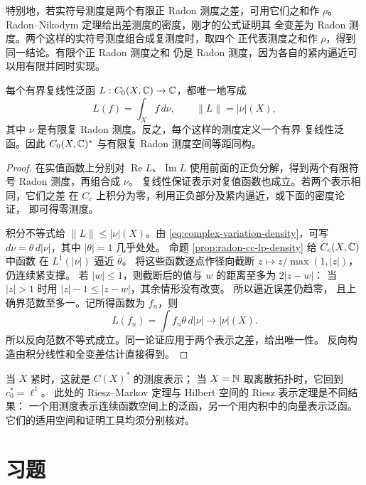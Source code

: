 特别地，若实符号测度是两个有限正 Radon 测度之差，可用它们之和作
\(\rho\)。Radon--Nikodym 定理给出差测度的密度，刚才的公式证明其
全变差为 Radon 测度。两个这样的实符号测度组合成复测度时，取四个
正代表测度之和作 \(\rho\)，得到同一结论。有限个正 Radon 测度之和
仍是 Radon 测度，因为各自的紧内逼近可以用有限并同时实现。

\begin{theorem}\label{thm:czero-complex-dual}
每个有界复线性泛函 \(L:C_0(X,\mathbb{C})\to\mathbb{C}\)，都唯一地写成
\[
 L(f)=\int_X f\,d\nu,\qquad \|L\|=|\nu|(X),
\]
其中 \(\nu\) 是有限复 Radon 测度。反之，每个这样的测度定义一个有界
复线性泛函。因此 \(C_0(X,\mathbb{C})^*\) 与有限复 Radon 测度空间等距同构。
\end{theorem}
\begin{proof}
在实值函数上分别对 \(\operatorname{Re}L\)、\(\operatorname{Im}L\)
使用前面的正负分解，得到两个有限符号 Radon 测度，再组合成 \(\nu\)。
复线性保证表示对复值函数也成立。若两个表示相同，它们之差
在 \(C_c\) 上积分为零，利用正负部分及紧内逼近，或下面的密度论证，
即可得零测度。

积分不等式给 \(\|L\|\le|\nu|(X)\)。由
\eqref{eq:complex-variation-density}，可写
\(d\nu=\theta\,d|\nu|\)，其中 \(|\theta|=1\) 几乎处处。
命题 \ref{prop:radon-cc-lp-density} 给 \(C_c(X,\mathbb{C})\) 中函数
在 \(L^1(|\nu|)\) 逼近 \(\overline\theta\)。
将这些函数逐点作径向截断 \(z\mapsto z/\max(1,|z|)\)，仍连续紧支撑。
若 \(|w|\le1\)，则截断后的值与 \(w\) 的距离至多为 \(2|z-w|\)：
当 \(|z|>1\) 时用 \(|z|-1\le|z-w|\)，其余情形没有改变。
所以逼近误差仍趋零，
且上确界范数至多一。记所得函数为 \(f_n\)，则
\[
 L(f_n)=\int f_n\theta\,d|\nu|\longrightarrow|\nu|(X).
\]
所以反向范数不等式成立。同一论证应用于两个表示之差，给出唯一性。
反向构造由积分线性和全变差估计直接得到。
\end{proof}

当 \(X\) 紧时，这就是 \(C(X)^*\) 的测度表示；
当 \(X=\mathbb{N}\) 取离散拓扑时，它回到 \(c_0^*=\ell^1\)。
此处的 Riesz--Markov 定理与 Hilbert 空间的 Riesz 表示定理是不同结果：
一个用测度表示连续函数空间上的泛函，另一个用内积中的向量表示泛函。
它们的适用空间和证明工具均须分别核对。

\section*{习题}

